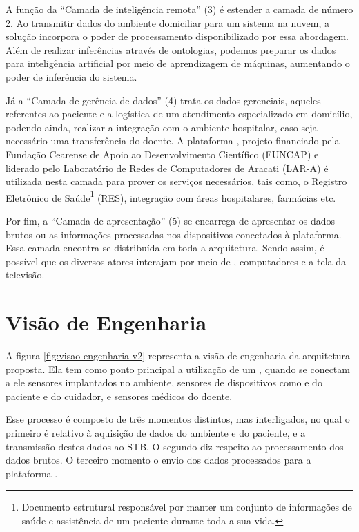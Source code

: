 A função da ``Camada de inteligência remota'' (3) é estender a camada de
número 2. Ao transmitir dados do ambiente domiciliar para um sistema na nuvem,
a solução incorpora o poder de processamento disponibilizado por essa
abordagem. Além de realizar inferências através de ontologias, podemos
preparar os dados para inteligência artificial por meio de aprendizagem de
máquinas, aumentando o poder de inferência do sistema.

Já a ``Camada de gerência de dados'' (4) trata os dados gerenciais, aqueles
referentes ao paciente e a logística de um atendimento especializado em
domicílio, podendo ainda, realizar a integração com o ambiente hospitalar, caso
seja necessário uma transferência do doente. A plataforma \nextsaude[],
projeto financiado pela Fundação Cearense de Apoio ao Desenvolvimento Científico 
(FUNCAP) e liderado pelo Laboratório de Redes de Computadores de Aracati (LAR-A) 
é utilizada nesta camada para prover os serviços necessários, tais como, o 
Registro Eletrônico de Saúde\footnote{Documento estrutural responsável por 
manter um conjunto de informações de saúde e assistência de um paciente durante 
toda a sua vida.} (RES), integração com áreas hospitalares, farmácias etc.

Por fim, a ``Camada de apresentação'' (5) se encarrega de apresentar os dados brutos
ou as informações processadas nos dispositivos conectados à plataforma. Essa
camada encontra-se distribuída em toda a arquitetura. Sendo assim, é possível
que os diversos atores interajam por meio de \smartphones, computadores e
a tela da televisão.

\section{Visão de Engenharia} \label{sec:visao-engenharia}

A figura \ref{fig:visao-engenharia-v2} representa a visão de engenharia da arquitetura
proposta. Ela tem como ponto principal a utilização de um \stb[], quando se
conectam a ele sensores  implantados no ambiente, sensores de dispositivos como
\smartphones[] e  \smartwatches[] do paciente e do cuidador, e sensores médicos
do doente.


Esse processo é composto de três momentos distintos, mas  interligados, no qual
o primeiro é relativo à aquisição de dados do ambiente e do paciente, e a
transmissão destes dados ao STB. O segundo diz respeito ao processamento dos
dados brutos. O terceiro momento o envio dos dados processados para a plataforma
\nextsaude[].

